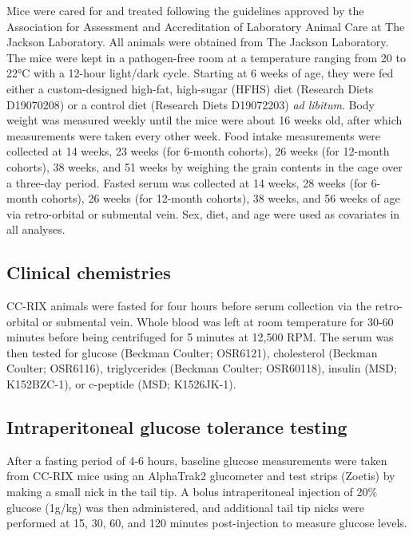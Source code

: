\documentclass[
]{article}
\begin{document}
Mice were cared for and treated following the guidelines approved by the
Association for Assessment and Accreditation of Laboratory Animal Care
at The Jackson Laboratory. All animals were obtained from The Jackson
Laboratory. The mice were kept in a pathogen-free room at a temperature
ranging from 20 to 22°C with a 12-hour light/dark cycle. Starting at 6
weeks of age, they were fed either a custom-designed high-fat,
high-sugar (HFHS) diet (Research Diets D19070208) or a control diet
(Research Diets D19072203) \textit{ad libitum}. Body weight was measured
weekly until the mice were about 16 weeks old, after which measurements
were taken every other week. Food intake measurements were collected at
14 weeks, 23 weeks (for 6-month cohorts), 26 weeks (for 12-month
cohorts), 38 weeks, and 51 weeks by weighing the grain contents in the
cage over a three-day period. Fasted serum was collected at 14 weeks, 28
weeks (for 6-month cohorts), 26 weeks (for 12-month cohorts), 38 weeks,
and 56 weeks of age via retro-orbital or submental vein. Sex, diet, and
age were used as covariates in all analyses.

\subsection{Clinical chemistries}\label{clinical-chemistries}

CC-RIX animals were fasted for four hours before serum collection via
the retro-orbital or submental vein. Whole blood was left at room
temperature for 30-60 minutes before being centrifuged for 5 minutes at
12,500 RPM. The serum was then tested for glucose (Beckman Coulter;
OSR6121), cholesterol (Beckman Coulter; OSR6116), triglycerides (Beckman
Coulter; OSR60118), insulin (MSD; K152BZC-1), or c-peptide (MSD;
K1526JK-1).

\subsection{Intraperitoneal glucose tolerance
testing}\label{intraperitoneal-glucose-tolerance-testing}

After a fasting period of 4-6 hours, baseline glucose measurements were
taken from CC-RIX mice using an AlphaTrak2 glucometer and test strips
(Zoetis) by making a small nick in the tail tip. A bolus intraperitoneal
injection of 20\% glucose (1g/kg) was then administered, and additional
tail tip nicks were performed at 15, 30, 60, and 120 minutes
post-injection to measure glucose levels.
\end{document}
